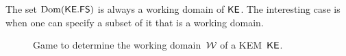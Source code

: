The set $\mathrm{Dom}(\mathsf{\mathsf{{\mathsf{KE}}.FS}})$ is always a working domain of ${\mathsf{KE}}$. The interesting case is when one can specify a subset of it that is a working domain.


 

 





\begin{figure}[tp]

	\caption{%
		Game to determine the working domain~${\cal W}$ of a KEM~${\mathsf{KE}}$.
	}
	\label{fig:DOM}
	\hrulefill
\end{figure}





